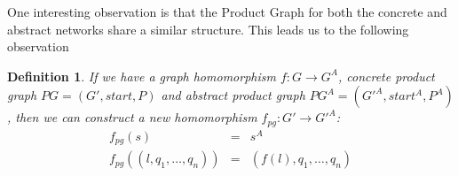 \documentclass[numbers, 10pt, preprint]{sigplanconf}
\renewcommand{\path}[2]{ #1 \mapsto \ensuremath{#2} }
\newtheorem{defn}{Definition}
\begin{document}
One interesting observation is that the Product Graph for both the concrete and abstract networks share a similar structure. This leads us to the following observation

\begin{defn}
If we have a graph homomorphism $f : G \rightarrow G^A$, concrete product graph $PG = (G',start,P)$ and abstract product graph $PG^A = (G'^A, start^A, P^A)$, then we can construct a new homomorphism $f_{pg} : G' \rightarrow G'^A$:
\[ \begin{array}{rcl}
  f_{pg}( s ) & = & s^A  \\
  f_{pg}( (l,q_1,\ldots,q_n) ) & = & (f(l),q_1,\ldots,q_n) \\
\end{array} \]
\end{defn}

\newcommand{\state}[4]{\node[state,#3](#1)[#4]{#2};}
\newcommand{\transition}[4]{\path[->] (#1) edge [#4] node {#3} (#2);}
\end{document}
